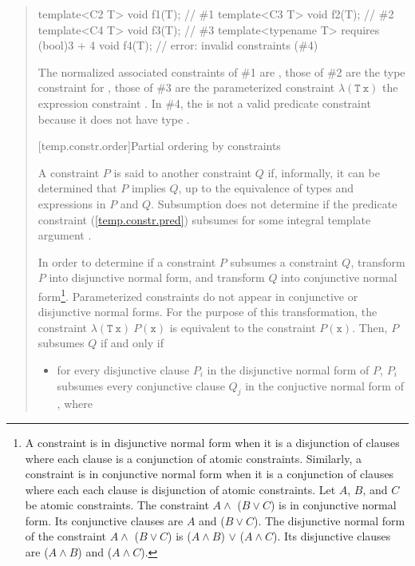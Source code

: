 \begin{quote}
\begin{codeblock}
template<C2 T> void f1(T);                            // \#1
template<C3 T> void f2(T);                            // \#2
template<C4 T> void f3(T);                            // \#3
template<typename T> requires (bool)3 + 4 void f4(T); // error: invalid constraints (\#4)
\end{codeblock}
The normalized associated constraints of \#1 are 
,
% 
those of \#2 are the type constraint for ,
%
those of \#3 are the parameterized constraint
$\lambda(\mathtt{T~x})$ the expression constraint .
% 
In \#4, the  
is not a valid predicate constraint because it does not have type .
\exitexample


[temp.constr.order]{Partial ordering by constraints}

\pnum
A constraint $P$ is said to  another constraint $Q$ 
if, informally, it can be determined that $P$ implies $Q$, up to 
the equivalence of types and expressions in $P$ and $Q$.
% 
\enterexample
Subsumption does not determine if the predicate constraint 
 (\ref{temp.constr.pred}) subsumes  for some 
integral template argument .
\exitexample

\pnum
In order to determine if a constraint $P$ subsumes a constraint
$Q$, transform $P$ into disjunctive normal form, 
and transform $Q$ into conjunctive normal form\footnote{
A constraint is in disjunctive normal form when it is a disjunction of
clauses where each clause is a conjunction of atomic constraints. 
% 
Similarly, a constraint is in conjunctive normal form when it is a conjunction 
of clauses where each each clause is disjunction of atomic constraints.
% 
\enterexample
Let $A$, $B$, and $C$ be atomic constraints.
% 
The constraint $A \land$ ($B \lor C$) is in 
conjunctive normal form.
% 
Its conjunctive clauses are $A$ and ($B \lor C$).
% 
The disjunctive normal form of the constraint
$A \land$ ($B \lor C$) 
is
($A \land B$) $\lor$ ($A \land C$).
% 
Its disjunctive clauses are ($A \land B$) and 
($A \land C$).
\exitexample
}.
% 
Parameterized constraints do not appear in conjunctive or disjunctive normal
forms. For the purpose of this transformation, the constraint
$\lambda(\mathtt{T~x})~P(\mathtt{x})$ is equivalent to the constraint 
$P(\mathtt{x})$.
% 
Then, $P$ subsumes $Q$ if and only if
\begin{itemize}
\item for every disjunctive clause $P_i$ in the disjunctive normal 
form of $P$, $P_i$ subsumes every conjunctive clause $Q_j$ 
in the conjuctive normal form of , where


\end{itemize}
\end{quote}
